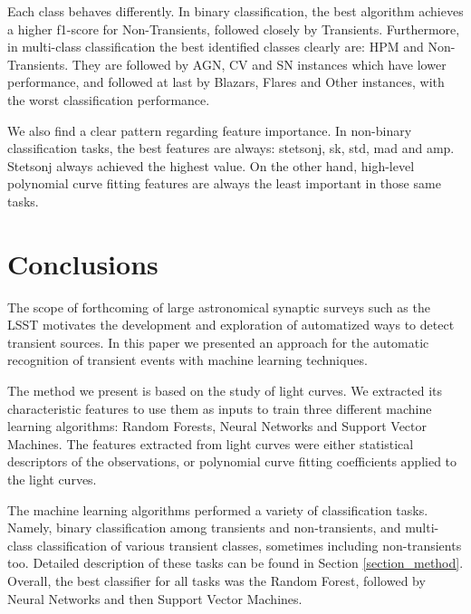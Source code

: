 \documentclass[a4paper,fleqn,usenatbib]{mnras}
\begin{document}
Each class behaves differently. 
In binary classification,
the best algorithm achieves a higher f1-score for Non-Transients,
followed closely by Transients. 
Furthermore, in multi-class
classification the best identified classes clearly are: HPM and
Non-Transients. They are followed by AGN, CV and SN instances which
have lower performance, and followed at last by Blazars, Flares and
Other instances, with the worst classification performance.  


We also find a clear pattern regarding feature importance. 
In non-binary classification tasks, the best features are always:
stetson\textunderscore j, sk, std, mad and amp. 
Stetson\textunderscore j always achieved the highest value. 
On the other hand, high-level polynomial curve fitting features
are always the least important in those same tasks. 


\section{Conclusions}

The scope of forthcoming of large astronomical synaptic surveys such
as the LSST \citep{0805.2366} motivates the development and
exploration of automatized ways to detect transient sources.
In this paper we presented an approach for the automatic recognition
of transient events with machine learning techniques.   

The method we present is based on the study of light curves. 
We extracted its characteristic features to use them as inputs
to train three different machine learning algorithms: Random Forests,
Neural Networks and Support Vector Machines.
The features extracted from light curves were either statistical
descriptors of the observations, or polynomial curve fitting
coefficients applied to the light curves.   

The machine learning algorithms performed a variety of classification tasks.
Namely, binary classification among transients and non-transients, and
multi-class classification of various transient classes, sometimes
including non-transients too. Detailed description of these tasks can
be found in Section \ref{section_method}.  
Overall, the best classifier for all tasks was the Random Forest,
followed by Neural Networks and then Support Vector Machines. 
\end{document}

